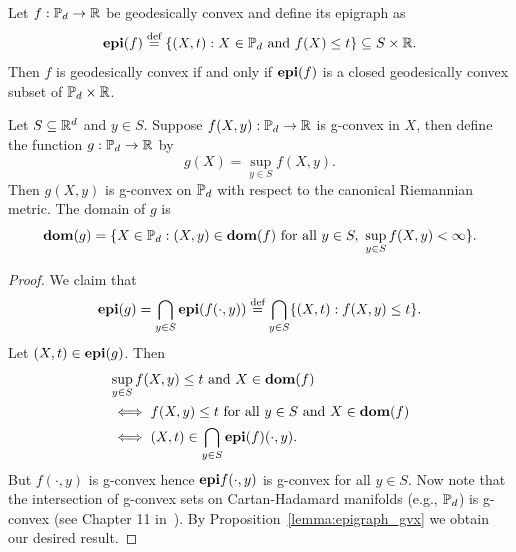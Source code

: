 \documentclass[twoside,11pt]{article}
\begin{document}
\begin{lemma}\label{lemma:epigraph_gvx}
    Let $f:\mathbb{P}_d \to \mathbb{R}$ be geodesically convex and define its epigraph as $$\textbf{epi}(f) \stackrel{\text{def}}{=} \{(X,t) : X \in \mathbb{P}_d \text{ and } f(X) \leq t\} \subseteq S \times \mathbb{R}.$$ Then $f$ is geodesically convex if and only if $\textbf{epi}(f)$ is a closed geodesically convex subset of $\mathbb{P}_d \times \mathbb{R}$.
\end{lemma}


\begin{prop}\label{prop:sup_gvx}
 Let $S\subseteq \mathbb{R}^d$ and  $y \in S$. Suppose $f(X,y): \mathbb{P}_d \to \mathbb{R}$ is g-convex in $X$, then define the function $g: \mathbb{P}_d \to \mathbb{R}$ by 
    \begin{equation*}
        g(X) = \sup_{y \in S}f(X,y).
    \end{equation*}
    Then $g(X,y)$ is g-convex on $\mathbb{P}_d$ with respect to the canonical Riemannian metric. The domain of $g$ is 
    \begin{equation*}
        \textbf{dom} (g) = \{X \in \mathbb{P}_d : (X,y) \in \textbf{dom}(f) \text{ for all } y \in S, \ \sup_{y \in S}f(X,y) < \infty\}.
    \end{equation*}   
\end{prop}

\begin{proof}
     We claim that 
    \begin{equation*}
        \textbf{epi}(g) = \bigcap_{y \in S}\textbf{epi}(f(\cdot, y)) \stackrel{\text{def}}{=} \bigcap_{y \in S}\{(X,t): f(X,y) \leq t\}.
    \end{equation*}
    Let $(X,t) \in \textbf{epi}(g)$. Then 
    \begin{align*}
        \begin{split}
            &\sup_{y \in S} f(X,y) \leq t \text{ and } X \in \textbf{dom}(f) 
            \\&\iff f(X,y) \leq t \text{ for all } y \in S  \text{ and } X \in \textbf{dom}(f) 
            \\&\iff (X,t) \in \bigcap_{y \in S} \textbf{epi}(f)(\cdot, y).
        \end{split}
    \end{align*} 
But $f(\cdot, y)$ is g-convex hence $\textbf{epi} f(\cdot, y)$ is g-convex for all $y \in S$. Now note that the intersection of g-convex sets on Cartan-Hadamard manifolds (e.g., $\mathbb{P}_d$) is g-convex (see Chapter 11 in~\citet{boumal2020introduction}). By Proposition~\ref{lemma:epigraph_gvx} we obtain our desired result. 
\end{proof}
 
\end{document}
